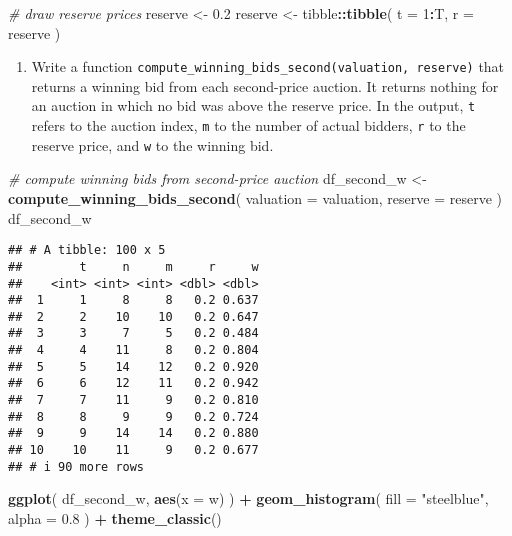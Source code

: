 \documentclass[
]{book}
\newenvironment{Shaded}{\begin{snugshade}}{\end{snugshade}}
\newcommand{\AttributeTok}[1]{\textcolor[rgb]{0.13,0.29,0.53}{#1}}
\newcommand{\CommentTok}[1]{\textcolor[rgb]{0.56,0.35,0.01}{\textit{#1}}}
\newcommand{\DecValTok}[1]{\textcolor[rgb]{0.00,0.00,0.81}{#1}}
\newcommand{\FloatTok}[1]{\textcolor[rgb]{0.00,0.00,0.81}{#1}}
\newcommand{\FunctionTok}[1]{\textcolor[rgb]{0.13,0.29,0.53}{\textbf{#1}}}
\newcommand{\NormalTok}[1]{#1}
\newcommand{\OtherTok}[1]{\textcolor[rgb]{0.56,0.35,0.01}{#1}}
\newcommand{\SpecialCharTok}[1]{\textcolor[rgb]{0.81,0.36,0.00}{\textbf{#1}}}
\newcommand{\StringTok}[1]{\textcolor[rgb]{0.31,0.60,0.02}{#1}}
\providecommand{\tightlist}{%
  \setlength{\itemsep}{0pt}\setlength{\parskip}{0pt}}
\begin{document}
\begin{Shaded}
\begin{Highlighting}[]
\CommentTok{\# draw reserve prices}
\NormalTok{reserve }\OtherTok{\textless{}{-}} \FloatTok{0.2}
\NormalTok{reserve }\OtherTok{\textless{}{-}} 
\NormalTok{  tibble}\SpecialCharTok{::}\FunctionTok{tibble}\NormalTok{(}
    \AttributeTok{t =} \DecValTok{1}\SpecialCharTok{:}\NormalTok{T, }
    \AttributeTok{r =}\NormalTok{ reserve}
\NormalTok{    )}
\end{Highlighting}
\end{Shaded}

\begin{enumerate}
\def\labelenumi{\arabic{enumi}.}
\setcounter{enumi}{2}
\tightlist
\item
  Write a function \texttt{compute\_winning\_bids\_second(valuation,\ reserve)} that returns a winning bid from each second-price auction. It returns nothing for an auction in which no bid was above the reserve price. In the output, \texttt{t} refers to the auction index, \texttt{m} to the number of actual bidders, \texttt{r} to the reserve price, and \texttt{w} to the winning bid.
\end{enumerate}

\begin{Shaded}
\begin{Highlighting}[]
\CommentTok{\# compute winning bids from second{-}price auction}
\NormalTok{df\_second\_w }\OtherTok{\textless{}{-}}
  \FunctionTok{compute\_winning\_bids\_second}\NormalTok{(}
    \AttributeTok{valuation =}\NormalTok{ valuation, }
    \AttributeTok{reserve =}\NormalTok{ reserve}
\NormalTok{    )}
\NormalTok{df\_second\_w}
\end{Highlighting}
\end{Shaded}

\begin{verbatim}
## # A tibble: 100 x 5
##        t     n     m     r     w
##    <int> <int> <int> <dbl> <dbl>
##  1     1     8     8   0.2 0.637
##  2     2    10    10   0.2 0.647
##  3     3     7     5   0.2 0.484
##  4     4    11     8   0.2 0.804
##  5     5    14    12   0.2 0.920
##  6     6    12    11   0.2 0.942
##  7     7    11     9   0.2 0.810
##  8     8     9     9   0.2 0.724
##  9     9    14    14   0.2 0.880
## 10    10    11     9   0.2 0.677
## # i 90 more rows
\end{verbatim}

\begin{Shaded}
\begin{Highlighting}[]
\FunctionTok{ggplot}\NormalTok{(}
\NormalTok{  df\_second\_w, }
  \FunctionTok{aes}\NormalTok{(}\AttributeTok{x =}\NormalTok{ w)}
\NormalTok{  ) }\SpecialCharTok{+} 
  \FunctionTok{geom\_histogram}\NormalTok{(}
    \AttributeTok{fill =} \StringTok{"steelblue"}\NormalTok{,}
    \AttributeTok{alpha =} \FloatTok{0.8}
\NormalTok{    ) }\SpecialCharTok{+} 
  \FunctionTok{theme\_classic}\NormalTok{()}
\end{Highlighting}
\end{Shaded}
\end{document}
